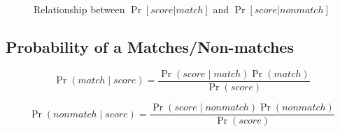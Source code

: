 \begin{figure}[ht]
  \centering
  \label{fig:otago_ent_psm}\\ %
  \label{fig:otago_ent_psnm}\\ %
  \caption{Relationship between $\Pr{[score|match]}$ and $\Pr{[score|nonmatch]}$}
  \label{fig:emd_grand} %
\end{figure}

\subsection{Probability of a Matches/Non-matches}

$$\Pr{(match \mid score)} = \frac{\Pr{(score \mid match)}\Pr{(match)}}
    {\Pr{(score)}}$$

$$\Pr{(nonmatch \mid score)} = \frac{\Pr{(score \mid nonmatch)}\Pr{(nonmatch)}}
    {\Pr{(score)}}$$

